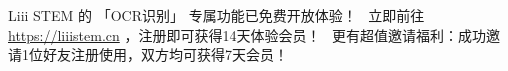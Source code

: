 
Liii STEM 的 「OCR识别」 专属功能已免费开放体验！ \
立即前往 \url{https://liiistem.cn} ，注册即可获得14天体验会员！ \
更有超值邀请福利：成功邀请1位好友注册使用，双方均可获得7天会员！
